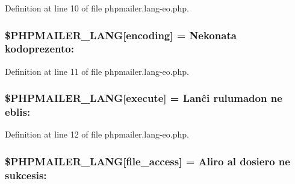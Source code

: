 Definition at line 10 of file phpmailer.\+lang-\/eo.\+php.

\subsubsection[{\texorpdfstring{\$\+P\+H\+P\+M\+A\+I\+L\+E\+R\+\_\+\+L\+A\+NG}{$PHPMAILER_LANG}}]{\setlength{\rightskip}{0pt plus 5cm}\$P\+H\+P\+M\+A\+I\+L\+E\+R\+\_\+\+L\+A\+NG\mbox{[}\textquotesingle{}encoding\textquotesingle{}\mbox{]} = \textquotesingle{}Nekonata kodoprezento\+: \textquotesingle{}}\hypertarget{phpmailer_8lang-eo_8php_a817f7283f3d54c970a0c10305cc668cc}{}\label{phpmailer_8lang-eo_8php_a817f7283f3d54c970a0c10305cc668cc}


Definition at line 11 of file phpmailer.\+lang-\/eo.\+php.

\subsubsection[{\texorpdfstring{\$\+P\+H\+P\+M\+A\+I\+L\+E\+R\+\_\+\+L\+A\+NG}{$PHPMAILER_LANG}}]{\setlength{\rightskip}{0pt plus 5cm}\$P\+H\+P\+M\+A\+I\+L\+E\+R\+\_\+\+L\+A\+NG\mbox{[}\textquotesingle{}execute\textquotesingle{}\mbox{]} = \textquotesingle{}Lanĉi rulumadon ne eblis\+: \textquotesingle{}}\hypertarget{phpmailer_8lang-eo_8php_a668217a9563a168f30f2a8548b6ed5a9}{}\label{phpmailer_8lang-eo_8php_a668217a9563a168f30f2a8548b6ed5a9}


Definition at line 12 of file phpmailer.\+lang-\/eo.\+php.

\subsubsection[{\texorpdfstring{\$\+P\+H\+P\+M\+A\+I\+L\+E\+R\+\_\+\+L\+A\+NG}{$PHPMAILER_LANG}}]{\setlength{\rightskip}{0pt plus 5cm}\$P\+H\+P\+M\+A\+I\+L\+E\+R\+\_\+\+L\+A\+NG\mbox{[}\textquotesingle{}file\+\_\+access\textquotesingle{}\mbox{]} = \textquotesingle{}Aliro al dosiero ne sukcesis\+: \textquotesingle{}}\hypertarget{phpmailer_8lang-eo_8php_a7e83349023b856ef9e5c46e30ae6d51e}{}\label{phpmailer_8lang-eo_8php_a7e83349023b856ef9e5c46e30ae6d51e}



